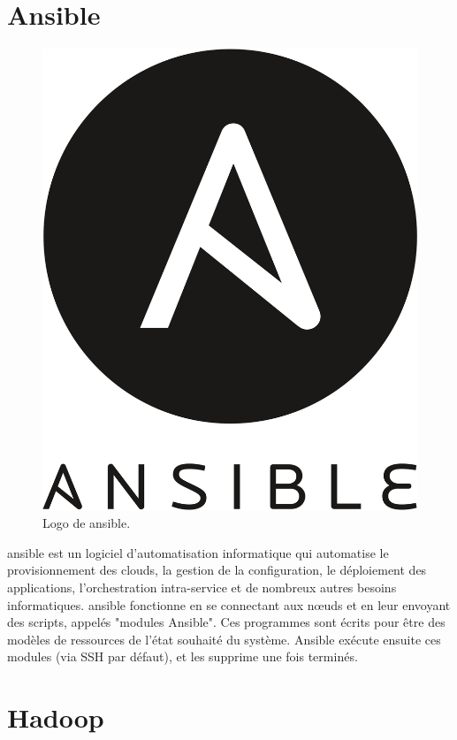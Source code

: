 \documentclass[12pt, french]{report}
\begin{document}
\section{Ansible}

\begin{figure}[h]
\includegraphics[scale=0.07]{assets/img/logo-ansible.png}
\centering
\caption{Logo de \gls{ansible}.}
\label{fig:logo-ansible}
\end{figure}

\gls{ansible} est un logiciel d'automatisation informatique qui automatise le provisionnement des clouds, la gestion de la configuration, le déploiement des applications, l'orchestration intra-service et de nombreux autres besoins informatiques. \gls{ansible} fonctionne en se connectant aux nœuds et en leur envoyant des scripts, appelés "modules Ansible". Ces programmes sont écrits pour être des modèles de ressources de l'état souhaité du système. Ansible exécute ensuite ces modules (via SSH par défaut), et les supprime une fois terminés.

\section{Hadoop}
\end{document}
